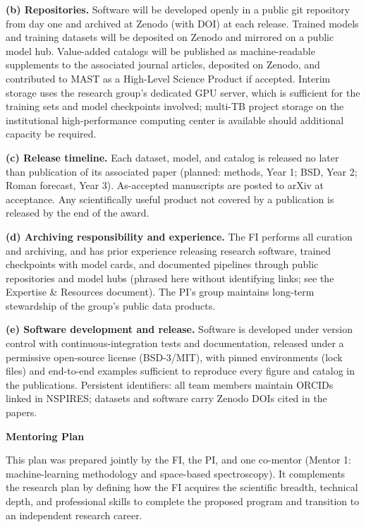 \documentclass[12pt,letterpaper]{article}
\begin{document}
\noindent\textbf{(b) Repositories.}
Software will be developed openly in a public git repository from day
one and archived at Zenodo (with DOI) at each release. Trained models and
training datasets will be deposited on Zenodo and mirrored on a public
model hub. Value-added catalogs will be published as machine-readable
supplements to the associated journal articles, deposited on Zenodo, and
contributed to MAST as a High-Level Science Product if accepted. Interim
storage uses the research group's dedicated GPU server, which is
sufficient for the training sets and model checkpoints involved;
multi-TB project storage on the institutional high-performance
computing center is available should additional capacity be required.

\noindent\textbf{(c) Release timeline.}
Each dataset, model, and catalog is released no later than publication of
its associated paper (planned: methods, Year 1; BSD, Year 2; Roman
forecast, Year 3). As-accepted manuscripts are posted to arXiv at
acceptance. Any scientifically useful product not covered by a
publication is released by the end of the award.

\noindent\textbf{(d) Archiving responsibility and experience.}
The FI performs all curation and archiving, and has prior experience
releasing research software, trained checkpoints with model cards, and
documented pipelines through public repositories and model hubs (phrased
here without identifying links; see the Expertise \& Resources document).
The PI's group maintains long-term stewardship of the group's public data
products.

\noindent\textbf{(e) Software development and release.}
Software is developed under version control with continuous-integration
tests and documentation, released under a permissive open-source license
(BSD-3/MIT), with pinned environments (lock files) and end-to-end
examples sufficient to reproduce every figure and catalog in the
publications. Persistent identifiers: all team members maintain ORCIDs
linked in NSPIRES; datasets and software carry Zenodo DOIs cited in the
papers.

\clearpage
\begin{center}{\large\bfseries Mentoring Plan}\end{center}

\noindent This plan was prepared jointly by the FI, the PI, and one
co-mentor (Mentor 1: machine-learning methodology and space-based
spectroscopy). It complements the research plan by defining how the FI
acquires the scientific breadth, technical depth, and professional
skills to complete the proposed program and transition to an independent
research career.
\end{document}
